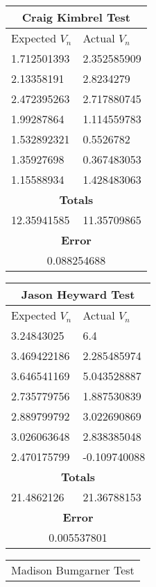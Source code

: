 \documentclass[12pt]{article}
\begin{document}
\begin{center}
\begin{tabular}{ |p{2.5cm}||p{2cm}|  }
\hline
\multicolumn{2}{|c|}{Craig Kimbrel Test} \\
\hline
Expected $V_n$ & Actual $V_n$ \\
\hline
 1.712501393 & 2.352585909   \\
\hline
2.13358191 &   2.8234279 \\
\hline
2.472395263 & 2.717880745  \\
\hline
1.99287864  & 1.114559783  \\
\hline
1.532892321 & 0.5526782  \\
 \hline
 1.35927698 & 0.367483053  \\
 \hline
 1.15588934 & 1.428483063  \\
 \hline
 \multicolumn{2}{|c|}{\textbf{Totals}} \\
 \hline
 12.35941585 & 11.35709865 \\
 \hline
 \multicolumn{2}{|c|}{\textbf{Error}} \\
 \hline
  \multicolumn{2}{|c|}{0.088254688} \\
 \hline
 \end{tabular}
\quad
\begin{tabular}{ |p{2.4cm}||p{2.5cm}|  }
\hline
\multicolumn{2}{|c|}{Jason Heyward Test} \\
\hline
Expected $V_n$ & Actual $V_n$ \\
\hline
 3.24843025 & 6.4   \\
\hline
3.469422186 &   2.285485974 \\
\hline
3.646541169 & 5.043528887  \\
\hline
2.735779756  & 1.887530839  \\
\hline
2.889799792 & 3.022690869  \\
 \hline
 3.026063648 & 2.838385048  \\
 \hline
 2.470175799 & -0.109740088  \\
 \hline
 \multicolumn{2}{|c|}{\textbf{Totals}} \\
 \hline
 21.4862126 & 21.36788153 \\
 \hline
 \multicolumn{2}{|c|}{\textbf{Error}} \\
 \hline
  \multicolumn{2}{|c|}{0.005537801} \\
 \hline
 \end{tabular}
\quad
\begin{tabular}{ |p{2.5cm}||p{2cm}|  }
\hline
\multicolumn{2}{|c|}{Madison Bumgarner Test} \\

\end{tabular}
\end{center}
\end{document}
